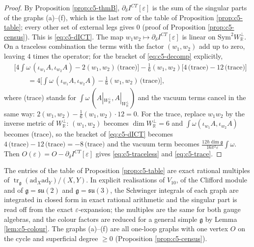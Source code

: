 \begin{proof}
By Proposition \ref{prop:c5-thmB}, $\partial_\delta I^{CT}[\varepsilon]$ is the sum of the singular parts of the graphs (a)--(f), which is the last row of the table of Proposition \ref{prop:c5-table}; every other set of external legs gives $0$ (proof of Proposition \ref{prop:c5-census}). This is \eqref{eq:c5-dICT}. The map $w_1w_2\mapsto\partial_\delta I^{CT}[\varepsilon]$ is linear on $\mathrm{Sym}^2W_{\mathbb R}^\perp$. On a traceless combination the terms with the factor $(w_1,w_2)$ add up to zero, leaving $4$ times the operator; for the bracket of \eqref{eq:c5-decomp} explicitly,
\[
\begin{aligned}
&\Big[4\int\omega\,(\iota_{w_1}A,\iota_{w_2}A)-2(w_1,w_2)\,\text{(trace)}\Big]-\tfrac16(w_1,w_2)\Big[4\,\text{(trace)}-12\,\text{(trace)}\Big]\\
&\qquad=4\Big[\int\omega\,(\iota_{w_1}A,\iota_{w_2}A)-\tfrac16(w_1,w_2)\,\text{(trace)}\Big],
\end{aligned}
\]
where (trace) stands for $\int\omega\,(A|_{W_{\mathbb R}^\perp},A|_{W_{\mathbb R}^\perp})$ and the vacuum terms cancel in the same way: $2(w_1,w_2)-\tfrac16(w_1,w_2)\cdot12=0$. For the trace, replace $w_1w_2$ by the inverse metric of $W_{\mathbb R}^\perp$: $(w_1,w_2)$ becomes $\dim W_{\mathbb R}^\perp=6$ and $\int\omega(\iota_{w_1}A,\iota_{w_2}A)$ becomes (trace), so the bracket of \eqref{eq:c5-dICT} becomes $4\,\text{(trace)}-12\,\text{(trace)}=-8\,\text{(trace)}$ and the vacuum term becomes $\frac{12\hbar\dim\mathfrak g}{16\pi^2\varepsilon}\int\omega$. Then $O(\varepsilon)=O-\partial_\delta I^{CT}[\varepsilon]$ gives \eqref{eq:c5-traceless} and \eqref{eq:c5-trace}.
\end{proof}

\begin{remark}
\label{rem:c5-verification}
The entries of the table of Proposition \ref{prop:c5-table} are exact rational multiples of $\operatorname{tr}_{\mathfrak g}(\mathrm{ad}_X\mathrm{ad}_Y)/(X,Y)$. In explicit realisations of $V_{10}$, of the Clifford module and of $\mathfrak g=\mathfrak{su}(2)$ and $\mathfrak g=\mathfrak{su}(3)$, the Schwinger integrals of each graph are integrated in closed form in exact rational arithmetic and the singular part is read off from the exact $\varepsilon$-expansion; the multiples are the same for both gauge algebras, and the colour factors are reduced for a general simple $\mathfrak g$ by Lemma \ref{lem:c5-colour}. The graphs (a)--(f) are all one-loop graphs with one vertex $O$ on the cycle and superficial degree $\ge0$ (Proposition \ref{prop:c5-census}).
\end{remark}
